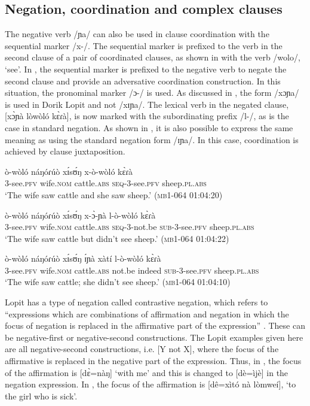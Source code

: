 \documentclass[output=paper,colorlinks,citecolor=brown,draftmode]{langscibook}
\begin{document}
\subsection{Negation, coordination and complex clauses}
\label{sec:lop:4.5}
The negative verb /ɲa/ can also be used in clause coordination with the sequential marker /x-/. The sequential marker is prefixed to the verb in the second clause of a pair of coordinated clauses, as shown in  with the verb /wolo/, ‘see’. In , the sequential marker is prefixed to the negative verb to negate the second clause and provide an adversative coordination construction.  In this situation, the pronominal marker /ɔ-/ is used.  As discussed in , the form /xɔɲa/ is used in Dorik Lopit and not /xɪɲa/. The lexical verb in the negated clause, [xɔ̀ɲà lòwòló kɛ̀ɾà], is now marked with the subordinating prefix /l-/, as is the case in standard negation. As shown in , it is also possible to express the same meaning as  using the standard negation form /ɪɲa/. In this case, coordination is achieved by clause juxtaposition.

\ea\label{ex:lop:102}
        \gll ò-wòló náŋóɾúò  xɪ́sʊ́ŋ x-ò-wòló  kɛ̀ɾà  \\ 
             3-see.\textsc{pfv} wife.\textsc{nom} cattle.\textsc{abs} \textsc{seq}{}-3-see.\textsc{pfv}  sheep.\textsc{pl.abs} \\
        \glt ‘The wife saw cattle and she saw sheep.’    (\textsc{mb1-064} 01:04:20)
\z

\ea\label{ex:lop:103}
        \gll ò-wòló náŋóɾúò  xɪ́sʊ́ŋ x-ɔ̀-ɲà l-ò-wòló  kɛ̀ɾà \\ 
             3-see.\textsc{pfv} wife.\textsc{nom} cattle.\textsc{abs} \textsc{seq}{}-3-not.be \textsc{sub}{}-3-see.\textsc{pfv}  sheep.\textsc{pl.abs} \\
        \glt ‘The wife saw cattle but didn't see sheep.’      (\textsc{mb1-064} 01:04:22)
\z

\ea\label{ex:lop:104}
        \gll ò-wòló náŋóɾúò  xɪ́sʊ́ŋ ɪ́ɲà xàtí l-ò-wòló  kɛ̀ɾà \\ 
             3-see.\textsc{pfv} wife.\textsc{nom} cattle.\textsc{abs} not.be indeed \textsc{sub}{}-3-see.\textsc{pfv}  sheep.\textsc{pl.abs} \\
        \glt ‘The wife saw cattle; she didn't see sheep.’      (\textsc{mb1-064} 01:04:10)
\z

Lopit has a type of negation called contrastive negation, which refers to “expressions which are combinations of affirmation and negation in which the focus of negation is replaced in the affirmative part of the expression” \citep[10]{Silvennoinen2019}.  These can be negative-first or negative-second constructions. The Lopit examples given here are all negative-second constructions, i.e. [Y not X], where the focus of the affirmative is replaced in the negative part of the expression. Thus, in , the focus of the affirmation is [dɛ̀=nàŋ] ‘with me’ and this is changed to [dè=ìjè] in the negation expression.  In , the focus of the affirmation is [dê=xìtó nà lòmweí], ‘to the girl who is sick’. 
\end{document}
